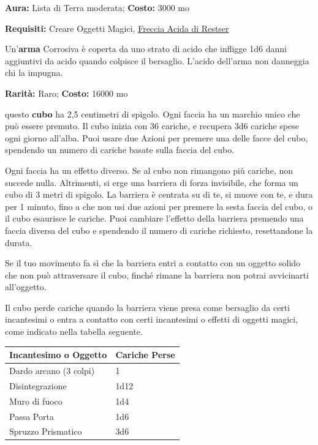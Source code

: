 \begin{multicols}{2}

\textbf{Aura:} Lista di Terra moderata; \textbf{Costo:} 3000 mo

\textbf{Requisiti:} Creare Oggetti Magici, \hyperlink{Freccia Acida di Restser}{Freccia Acida di Restser}

Un'\textbf{arma} Corrosiva è coperta da uno strato di acido che infligge 1d6 danni aggiuntivi da acido quando colpisce il bersaglio. L'acido dell'arma non danneggia chi la impugna.


\textbf{Rarità:} Raro; \textbf{Costo:} 16000 mo

questo \textbf{cubo} ha 2,5 centimetri di spigolo. Ogni faccia ha un marchio unico che può essere premuto. Il cubo inizia con 36 cariche, e recupera 3d6 cariche spese ogni giorno all'alba. Puoi usare due Azioni per premere una delle facce del cubo, spendendo un numero di cariche basate sulla faccia del cubo.

Ogni faccia ha un effetto diverso. Se al cubo non rimangono più cariche, non succede nulla. Altrimenti, si erge una barriera di forza invisibile, che forma un cubo di 3 metri di spigolo. La barriera è centrata su di te, si muove con te, e dura per 1 minuto, fino a che non usi due azioni per premere la sesta faccia del cubo, o il cubo esaurisce le cariche. Puoi cambiare l'effetto della barriera premendo una faccia diversa del cubo e spendendo il numero di cariche richiesto, resettandone la durata.

Se il tuo movimento fa sì che la barriera entri a contatto con un oggetto solido che non può attraversare il cubo, finché rimane la barriera non potrai avvicinarti all'oggetto.

Il cubo perde cariche quando la barriera viene presa come bersaglio da certi incantesimi o entra a contatto con certi incantesimi o effetti di oggetti magici, come indicato nella tabella seguente.

\medskip

\noindent\begin{tabularx}{\linewidth}{ll}
	\toprule
\rowcolor{gray!20}\textbf{Incantesimo o Oggetto} &\textbf{Cariche Perse}\\
\toprule
Dardo arcano (3 colpi) &1\\
\rowcolor{gray!20}Disintegrazione &1d12\\
Muro di fuoco &1d4\\
\rowcolor{gray!20}Passa Porta& 1d6\\
Spruzzo Prismatico &3d6
\end{tabularx}


\end{multicols}

